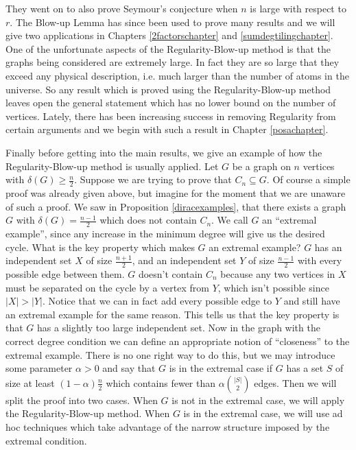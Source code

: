 \documentclass[oneside,12pt]{memoir}
\begin{document}
They went on to also prove Seymour's conjecture when $n$ is large with respect to $r$.  The Blow-up Lemma has since been used to prove many results
and we will give two applications in Chapters \ref{2factorschapter} and \ref{sumdegtilingchapter}.  One of the unfortunate aspects of the Regularity-Blow-up method is that
the graphs being considered are extremely large. In fact they are so large that
they exceed any physical description, i.e. much larger than the number
of atoms in the universe.  So any result which is proved using the Regularity-Blow-up method leaves open the general statement which has no lower bound on the number of vertices.  Lately,
there has been increasing success in removing Regularity from certain arguments and we begin
with such a result in Chapter \ref{posachapter}.

Finally before getting into the main results, we give an example of how the Regularity-Blow-up method is usually
applied.  Let $G$ be a graph on $n$ vertices with $\delta(G)\geq
\frac{n}{2}$.  Suppose we are trying to prove that $C_n\subseteq G$.
Of course a simple proof was already given above, but imagine for the
moment that we are unaware of such a proof.  We saw in Proposition \ref{diracexamples}, that there exists a graph $G$ with $\delta(G)=\frac{n-1}{2}$ which does not contain $C_n$.  We call $G$ an ``extremal example'', since any increase in the minimum degree will give us the desired cycle. What is the key property which makes $G$ an extremal example? $G$ has an independent set $X$ of size $\frac{n+1}{2}$, and an independent set $Y$ of size $\frac{n-1}{2}$ with every possible edge between them. $G$ doesn't contain $C_n$ because any two vertices in $X$ must be separated on the cycle by a vertex from $Y$, which isn't possible since $|X|>|Y|$. Notice that we can in fact add every possible edge to $Y$ and still have an extremal example for the same reason.  This tells us that the key property is that $G$ has a slightly too large independent set.  Now in the graph with the correct degree condition we can define an appropriate notion of ``closeness'' to the extremal example.  There is no one right way to do this, but we may introduce some parameter $\alpha>0$ and say that $G$ is in the extremal case if $G$ has a set $S$ of size at least $(1-\alpha)\frac{n}{2}$ which contains fewer than $\alpha\binom{|S|}{2}$ edges.  Then we will split the proof into two cases. When $G$ is not in the extremal case, we will apply the Regularity-Blow-up method.  When $G$ is in the extremal case, we will use ad hoc techniques which take advantage of the narrow structure imposed by the extremal condition.
\end{document}
